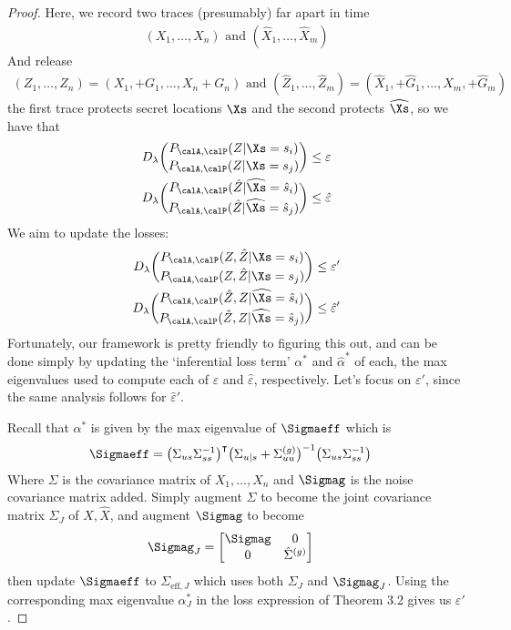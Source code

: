 \begin{proof}
Here, we record two traces (presumably) far apart in time 
\begin{align*}
	(X_1, \dots, X_n) \text{ and } (\hat{X}_1, \dots, \hat{X}_m)
\end{align*}
And release
\begin{align*}
	(Z_1, \dots, Z_n) = (X_1, + G_1, \dots, X_n + G_n) \text{ and } (\hat{Z}_1, \dots, \hat{Z}_m) = (\hat{X}_1, + \hat{G}_1, \dots, \hat{X}_m, + \hat{G}_m)
\end{align*}
the first trace protects secret locations $\Xs$ and the second protects $\widehat{\Xs}$, so we have that 
\begin{align*}
	D_\lambda \binom{P_{\calA, \calP}(Z | \Xs = s_i)}{P_{\calA, \calP}(Z | \Xs = s_j)} &\leq \varepsilon \\
	D_\lambda \binom{P_{\calA, \calP}(\hat{Z} | \widehat{\Xs} = \hat{s}_i)}{P_{\calA, \calP}(\hat{Z} | \widehat{\Xs} = \hat{s}_j)} &\leq \hat{\varepsilon}
\end{align*}
We aim to update the losses: 
\begin{align*}
	D_\lambda \binom{P_{\calA, \calP}(Z, \hat{Z} | \Xs = s_i)}{P_{\calA, \calP}(Z, \hat{Z} | \Xs = s_j)} &\leq \varepsilon' \\
	D_\lambda \binom{P_{\calA, \calP}(\hat{Z}, Z | \widehat{\Xs} = \hat{s}_i)}{P_{\calA, \calP}(\hat{Z}, Z | \widehat{\Xs} = \hat{s}_j)} &\leq \hat{\varepsilon}'
\end{align*}
Fortunately, our framework is pretty friendly to figuring this out, and can be done simply by updating the `inferential loss term' $\alpha^*$ and $\hat{\alpha}^*$ of each, the max eigenvalues used to compute each of $\varepsilon$ and $\hat{\varepsilon}$, respectively. Let's focus on $\varepsilon'$, since the same analysis follows for $\hat{\varepsilon}'$.  

Recall that $\alpha^*$ is given by the max eigenvalue of $\Sigmaeff$ which is 
\begin{align*}
	\Sigmaeff 
	&= \big(\Sigma_{us} \Sigma_{ss}^{-1}\big)^\intercal \big( \Sigma_{u | s} + \Sigma_{uu}^{(g)} \big)^{-1} \big(\Sigma_{us} \Sigma_{ss}^{-1}\big)
\end{align*}
Where $\Sigma$ is the covariance matrix of $X_1, \dots, X_n$ and $\Sigmag$ is the noise covariance matrix added. Simply augment $\Sigma$ to become the joint covariance matrix $\Sigma_J$ of $X, \hat{X}$, and augment $\Sigmag$ to become 
\begin{align*}
	\Sigmag_J
	&= 
	\begin{bmatrix}
		\Sigmag & 0 \\
		0 & \hat{\Sigma}^{(g)}
	\end{bmatrix}
\end{align*}
then update $\Sigmaeff$ to $\Sigma_{\text{eff}, J}$ which uses both $\Sigma_J$ and $\Sigmag_J$. Using the corresponding max eigenvalue $\alpha^*_J$ in the loss expression of Theorem 3.2 gives us $\varepsilon'$. 


\end{proof}
